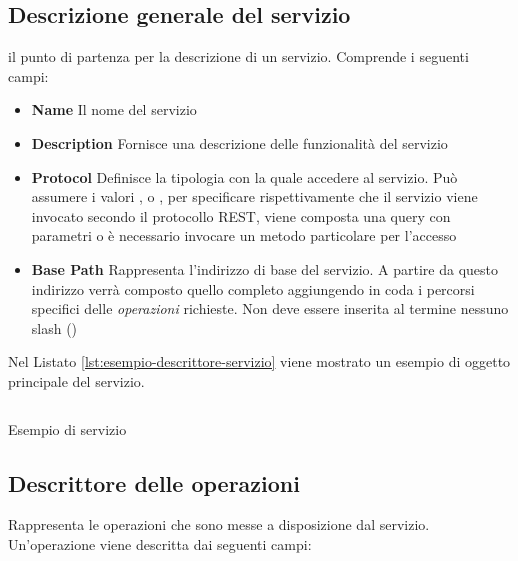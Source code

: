 \subsection{Descrizione generale del servizio\label{sec:oggetto-principale-servizi}}

\upe il punto di partenza per la descrizione di un servizio. Comprende i seguenti campi:

\begin{itemize}
	\item \textbf{Name}
	Il nome del servizio
	\item \textbf{Description}
	Fornisce una descrizione delle funzionalità del servizio
	\item \textbf{Protocol}
	Definisce la tipologia con la quale accedere al servizio. Può assumere i valori ,  o , per specificare rispettivamente che il servizio viene invocato secondo il protocollo REST, viene composta una query con parametri o è necessario invocare un metodo particolare per l'accesso
	\item \textbf{Base Path}
	Rappresenta l'indirizzo di base del servizio. A partire da questo indirizzo verrà composto quello completo aggiungendo in coda i percorsi specifici delle \emph{operazioni} richieste. Non deve essere inserita al termine nessuno slash (\virgolette{/})
\end{itemize}

Nel Listato \ref{lst:esempio-descrittore-servizio} viene mostrato un esempio di oggetto principale del servizio.

\begin{listing}[H]
	\inputminted{json}{5-implementazione-backend/Codice/esempio_descrittore_servizio.json}
	\caption{Esempio di servizio}
	\label{lst:esempio-descrittore-servizio}
\end{listing}

\subsection{Descrittore delle operazioni\label{sec:descrittore-operazioni}}

Rappresenta le operazioni che sono messe a disposizione dal servizio. Un'o\-pe\-ra\-zio\-ne viene descritta dai seguenti campi:

